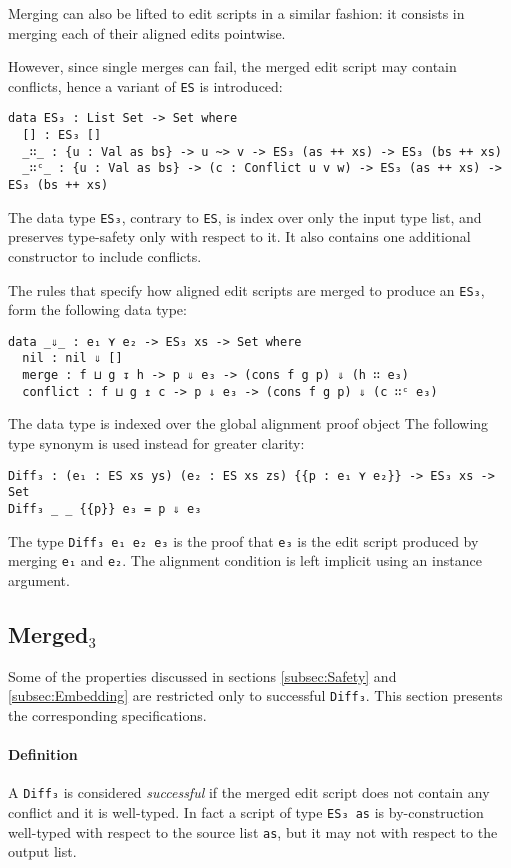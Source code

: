 \documentclass[../Thesis.tex]{subfiles}
\begin{document}
	Merging can also be lifted to edit scripts in a similar fashion: it
	consists in merging each of their aligned edits pointwise.
	
	However, since single merges can fail, the merged edit
	script may contain conflicts, hence a variant of \texttt{ES} 
	is introduced:
	\begin{verbatim}
data ES₃ : List Set -> Set where
  [] : ES₃ []
  _∷_ : {u : Val as bs} -> u ~> v -> ES₃ (as ++ xs) -> ES₃ (bs ++ xs)
  _∷ᶜ_ : {u : Val as bs} -> (c : Conflict u v w) -> ES₃ (as ++ xs) -> ES₃ (bs ++ xs)
	\end{verbatim}
	
	The data type \texttt{ES₃}, contrary to \texttt{ES}, is index over only 
	the input type list, and preserves type-safety only with respect to it.
	It also contains one additional constructor to include conflicts.
	
	The rules that specify how aligned edit scripts are merged to produce
	an \texttt{ES₃}, form the following data type:
	
\begin{verbatim}
data _⇓_ : e₁ ⋎ e₂ -> ES₃ xs -> Set where
  nil : nil ⇓ []
  merge : f ⊔ g ↧ h -> p ⇓ e₃ -> (cons f g p) ⇓ (h ∷ e₃)
  conflict : f ⊔ g ↥ c -> p ⇓ e₃ -> (cons f g p) ⇓ (c ∷ᶜ e₃)
\end{verbatim}

	The data type is indexed over the global alignment proof object
	The following type synonym is used instead for greater clarity:
\begin{verbatim}
Diff₃ : (e₁ : ES xs ys) (e₂ : ES xs zs) {{p : e₁ ⋎ e₂}} -> ES₃ xs -> Set
Diff₃ _ _ {{p}} e₃ = p ⇓ e₃
\end{verbatim}
	The type \texttt{Diff₃ e₁ e₂ e₃} is the proof that \texttt{e₃} is the edit script
	produced by merging \texttt{e₁} and \texttt{e₂}. The alignment condition is 
	left implicit using	 an instance argument.	
	
	\subsection{Merged$_3$}
	\label{subsec:Merged3}
	Some of the properties discussed in sections \ref{subsec:Safety} and
	\ref{subsec:Embedding} are restricted only to successful \texttt{Diff₃}.
	This section presents the corresponding specifications.

	\paragraph{Definition}
	A \texttt{Diff₃} is considered \emph{successful} if the merged edit script
	does not contain any conflict and it is well-typed.
	In fact a script of type \texttt{ES₃ as} is by-construction 
	well-typed with respect to the source list \texttt{as}, 
	but it may not with respect to the output list.
	
\end{document}
